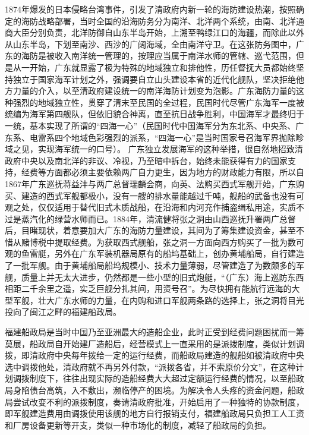 \documentclass[12pt,UTF8]{ctexbook}
\begin{document}
1874年爆发的日本侵略台湾事件，引发了清政府内新一轮的海防建设热潮，按照确定的海防战略部署，当时全国的沿海防务分为南洋、北洋两个系统，由南、北洋通商大臣分别负责，北洋防御自山东半岛开始，上溯至鸭绿江口的海疆，而除此以外从山东半岛，下划至南沙、西沙的广阔海域，全由南洋守卫。在这张防务图中，广东的海防是被收入南洋统一管理的，按理应当属于南洋水师的管辖、巡弋范围，但是从一开始，广东就显露了极为特殊的地域独立和排他性，历任督抚大员都始终坚持独立于国家海军计划之外，强调要自立山头建设本省的近代化舰队，坚决拒绝他方力量的介入，以至清政府建设统一的南洋海防计划变为泡影。广东海防力量的这种强烈的地域独立性，贯穿了清末至民国的全过程，民国时代尽管广东海军一度被统编为海军第四舰队，但依旧貌合神离，直至抗日战争胜利，中国海军才最终归于一统，基本实现了所谓的“四海一心”（民国时代中国海军分为东北系、中央系、广东系、电雷系四个地域色彩强烈的派系，“四海一心”是当时国家号召海军界抛除畛域之见，实现海军统一的口号）。
广东独立发展海军的这种举措，很自然地招致清政府中央以及南北洋的非议、冷视，乃至暗中拆台，始终未能获得有力的国家支持，经费等方面都必须主要依赖两广自力更生，因为地方的财政能力有限，所以自1867年广东巡抚蒋益沣与两广总督瑞麟会商，向英、法购买西式军舰开始，广东购买、建造的西式军舰都极小，没有一艘的排水量能越过千吨，舰船的武备也没有可观之处，仅仅适用于替代旧式木质战船，在沿海和内河充作捕盗缉私用途，实质不过是蒸汽化的绿营水师而已。1884年，清流健将张之洞由山西巡抚升署两广总督后，目睹现状，着意要加大广东的海防力量建设，其间为了筹集建设资金，甚至不惜从赌博税中提取经费。为获取西式舰船，张之洞一方面向西方购买了一批为数可观的鱼雷艇，另外在广东军装机器局原有的船坞基础上，创办黄埔船局，自行建造了一批军舰。由于黄埔船局船坞规模小、技术力量薄弱，尽管建造了为数颇多的军舰，质量上并无太大进步，仍然都是一些小型的旧式炮艇，“（广东）海上巡防东西相距二千余里之遥，实乏巨舰分扎其间，用资号召”。为尽快拥有能航行远海的大型军舰，壮大广东水师的力量，在内购和进口军舰两条路的选择上，张之洞将目光投向了闽江之畔的福建船政局。

福建船政局是当时中国乃至亚洲最大的造船企业，此时正受到经费问题困扰而一筹莫展，船政局自开始建厂造船后，经营模式上一直采用的是派拨制度，类似计划调拨，即清政府中央每年拨给一定的运行经费，而船政局建造的舰船如被清政府中央选中调拨他处，清政府就不再另外付款，“派拨各省，并不索原价分文”，在这种计划调拨制度下，往往出现实际的造船经费大大超过定额运行经费的情况，以至船政局身陷债台高筑，入不敷出，濒临停产的困境。为解决令人头疼的资金问题，船政局尝试改变不利的派拨制度，奏请清政府批准，开始启用了一种独特的协款制度，即军舰建造费用由调拨使用该舰的地方自行报销支付，福建船政局只负担工人工资和厂房设备更新等开支，类似一种市场化的制度，减轻了船政局的负担。
\end{document}
